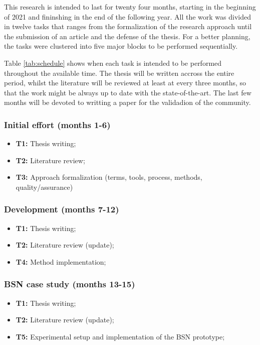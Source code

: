 This research is intended to last for twenty four months, starting in the beginning of 2021 and fininshing in the end of the following year. All the work was divided in twelve tasks that ranges from the formalization of the research approach until the submission of an article and the defense of the thesis. For a better planning, the tasks were clustered into five major blocks to be performed sequentially. 

Table \ref{tab:schedule} shows when each task is intended to be performed throughout the available time. The thesis will be written accross the entire period, whilst the literature will be reviewed at least at every three months, so that the work might be always up to date with the state-of-the-art. The last few months will be devoted to writting a paper for the validadion of the community.


\subsubsection{Initial effort (months 1-6)}
\begin{itemize}
\item \textbf{T1:} Thesis writing;
\item \textbf{T2:} Literature review;
\item \textbf{T3:} Approach formalization (terms, tools, process, methods, quality/assurance)
\end{itemize}

\subsubsection{Development (months 7-12)}
\begin{itemize}
	\item \textbf{T1:} Thesis writing;
	\item \textbf{T2:} Literature review (update);
	\item \textbf{T4:} Method implementation;
\end{itemize}

\subsubsection{BSN case study (months 13-15)}
\begin{itemize}
	\item \textbf{T1:} Thesis writing;
	\item \textbf{T2:} Literature review (update);
	\item \textbf{T5:} Experimental setup and implementation of the BSN prototype;
\end{itemize}

